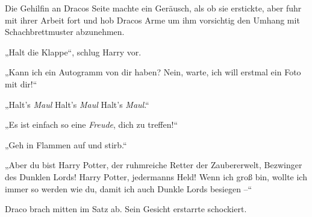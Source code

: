 Die Gehilfin an Dracos Seite machte ein Geräusch, als ob sie erstickte, aber fuhr mit ihrer Arbeit fort und hob Dracos Arme um ihm vorsichtig den Umhang mit Schachbrettmuster abzunehmen.

„Halt die Klappe“, schlug Harry vor.

„Kann ich ein Autogramm von dir haben? Nein, warte, ich will erstmal ein Foto mit dir!“

„Halt’s \emph{Maul} Halt’s \emph{Maul} Halt’s \emph{Maul}.“

„Es ist einfach so eine \emph{Freude}, dich zu treffen!“

„Geh in Flammen auf und stirb.“

„Aber du bist Harry Potter, der ruhmreiche Retter der Zaubererwelt, Bezwinger des Dunklen Lords! Harry Potter, jedermanns Held! Wenn ich groß bin, wollte ich immer so werden wie du, damit ich auch Dunkle Lords besiegen –“

Draco brach mitten im Satz ab. Sein Gesicht erstarrte schockiert.

